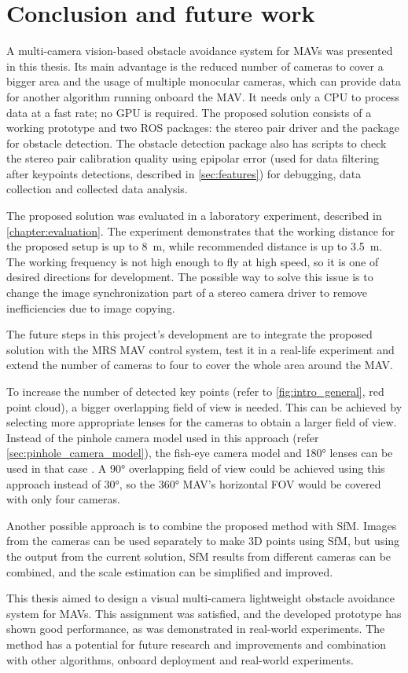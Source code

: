 \chapter{Conclusion and future work}
\label{chapter:conclusion}

A multi-camera vision-based obstacle avoidance system for MAVs was presented in this thesis. 
Its main advantage is the reduced number of cameras to cover a bigger area and the usage of multiple monocular cameras, which can provide data for another algorithm running onboard the MAV.
It needs only a CPU to process data at a fast rate; no GPU is required.
The proposed solution consists of a working prototype and two ROS packages: the stereo pair driver and the package for obstacle detection.
The obstacle detection package also has scripts to check the stereo pair calibration quality using epipolar error (used for data filtering after keypoints detections, described in \autoref{sec:features}) for debugging, data collection and collected data analysis.

The proposed solution was evaluated in a laboratory experiment, described in \autoref{chapter:evaluation}. 
The experiment demonstrates that the working distance for the proposed setup is up to \SI{8}{\meter}, while recommended distance is up to \SI{3.5}{\meter}. 
The working frequency is not high enough to fly at high speed, so it is one of desired directions for development.
The possible way to solve this issue is to change the image synchronization part of a stereo camera driver to remove inefficiencies due to image copying.

The future steps in this project's development are to integrate the proposed solution with the MRS MAV control system, test it in a real-life experiment and extend the number of cameras to four to cover the whole area around the MAV.

To increase the number of detected key points (refer to \autoref{fig:intro_general}, red point cloud), a bigger overlapping field of view is needed.
This can be achieved by selecting more appropriate lenses for the cameras to obtain a larger field of view.
Instead of the pinhole camera model used in this approach (refer \autoref{sec:pinhole_camera_model}), the fish-eye camera model and \ang{180} lenses can be used in that case \cite{fish-eye}.
A \ang{90} overlapping field of view could be achieved using this approach instead of \ang{30}, so the \ang{360} MAV's horizontal FOV would be covered with only four cameras.

Another possible approach is to combine the proposed method with SfM.
Images from the cameras can be used separately to make 3D points using SfM, but using the output from the current solution, SfM results from different cameras can be combined, and the scale estimation can be simplified and improved.

This thesis aimed to design a visual multi-camera lightweight obstacle avoidance system for MAVs. 
This assignment was satisfied, and the developed prototype has shown good performance, as was demonstrated in real-world experiments.
The method has a potential for future research and improvements and combination with other algorithms, onboard deployment and real-world experiments.